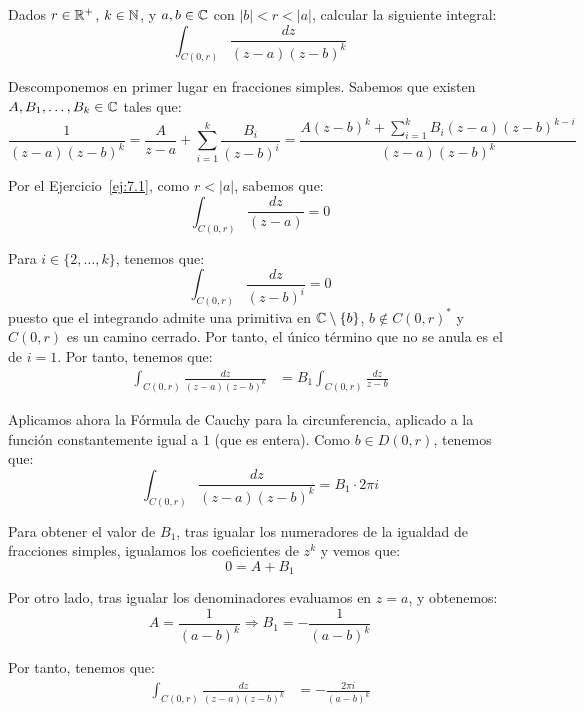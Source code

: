 \begin{ejercicio}
    Dados $r \in \mathbb{R}^+$, $k \in \mathbb{N}$, y $a,b \in \mathbb{C}$ con $|b| < r < |a|$, calcular la siguiente integral:
    \begin{equation*}
        \int_{C(0,r)} \frac{dz}{(z-a)(z-b)^k}
    \end{equation*}

    Descomponemos en primer lugar en fracciones simples. Sabemos que existen $A,B_1,\ldots,B_k \in \mathbb{C}$ tales que:
    \begin{equation*}
        \frac{1}{(z-a)(z-b)^k} = \frac{A}{z-a} + \sum\limits_{i=1}^{k} \frac{B_i}{(z-b)^i} = \frac{A(z-b)^k + \sum\limits_{i=1}^{k} B_i(z-a)(z-b)^{k-i}}{(z-a)(z-b)^k}
    \end{equation*}

    Por el Ejercicio~\ref{ej:7.1}, como $r<|a|$, sabemos que:
    \begin{equation*}
        \int_{C(0,r)} \frac{dz}{(z-a)}=0
    \end{equation*}

    Para $i\in \{2,\ldots,k\}$, tenemos que:
    \begin{equation*}
        \int_{C(0,r)} \frac{dz}{(z-b)^i} = 0
    \end{equation*}
    puesto que el integrando admite una primitiva en $\mathbb{C}\setminus\{b\}$, $b\notin C(0,r)^*$ y $C(0,r)$ es un camino cerrado. Por tanto, el único término que no se anula es el de $i=1$. Por tanto, tenemos que:
    \begin{align*}
        \int_{C(0,r)} \frac{dz}{(z-a)(z-b)^k} &= B_1\int_{C(0,r)} \frac{dz}{z-b}
    \end{align*}

    Aplicamos ahora la Fórmula de Cauchy para la circunferencia, aplicado a la función constantemente igual a $1$ (que es entera). Como $b\in D(0,r)$, tenemos que:
    \begin{equation*}
        \int_{C(0,r)} \frac{dz}{(z-a)(z-b)^k} = B_1\cdot 2\pi i
    \end{equation*}

    Para obtener el valor de $B_1$, tras igualar los numeradores de la igualdad de fracciones simples, igualamos los coeficientes de $z^{k}$ y vemos que:
    \begin{equation*}
        0 = A+B_1
    \end{equation*}

    Por otro lado, tras igualar los denominadores evaluamos en $z=a$, y obtenemos:
    \begin{equation*}
        A=\frac{1}{(a-b)^k} \Longrightarrow B_1 = -\frac{1}{(a-b)^k}
    \end{equation*}

    Por tanto, tenemos que:
    \begin{align*}
        \int_{C(0,r)} \frac{dz}{(z-a)(z-b)^k} &= -\frac{2\pi i}{(a-b)^k}
    \end{align*}
\end{ejercicio}

